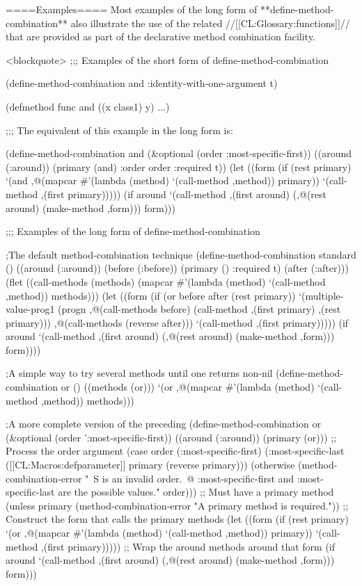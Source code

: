 ====Examples====
Most examples of the long form of **define-method-combination** also illustrate the use of the related //[[CL:Glossary:functions]]// that are provided as part of the declarative method combination facility.

<blockquote> ;;; Examples of the short form of define-method-combination

(define-method-combination and :identity-with-one-argument t)

(defmethod func and ((x class1) y) ...)

;;; The equivalent of this example in the long form is:

(define-method-combination and (&optional (order :most-specific-first)) ((around (:around)) (primary (and) :order order :required t)) (let ((form (if (rest primary) `(and ,@(mapcar #'(lambda (method) `(call-method ,method)) primary)) `(call-method ,(first primary))))) (if around `(call-method ,(first around) (,@(rest around) (make-method ,form))) form)))

;;; Examples of the long form of define-method-combination

;The default method-combination technique (define-method-combination standard () ((around (:around)) (before (:before)) (primary () :required t) (after (:after))) (flet ((call-methods (methods) (mapcar #'(lambda (method) `(call-method ,method)) methods))) (let ((form (if (or before after (rest primary)) `(multiple-value-prog1 (progn ,@(call-methods before) (call-method ,(first primary) ,(rest primary))) ,@(call-methods (reverse after))) `(call-method ,(first primary))))) (if around `(call-method ,(first around) (,@(rest around) (make-method ,form))) form))))

;A simple way to try several methods until one returns non-nil (define-method-combination or () ((methods (or))) `(or ,@(mapcar #'(lambda (method) `(call-method ,method)) methods)))

;A more complete version of the preceding (define-method-combination or (&optional (order ':most-specific-first)) ((around (:around)) (primary (or))) ;; Process the order argument (case order (:most-specific-first) (:most-specific-last ([[CL:Macros:defparameter]] primary (reverse primary))) (otherwise (method-combination-error "~S is an invalid order.~@ :most-specific-first and :most-specific-last are the possible values." order))) ;; Must have a primary method (unless primary (method-combination-error "A primary method is required.")) ;; Construct the form that calls the primary methods (let ((form (if (rest primary) `(or ,@(mapcar #'(lambda (method) `(call-method ,method)) primary)) `(call-method ,(first primary))))) ;; Wrap the around methods around that form (if around `(call-method ,(first around) (,@(rest around) (make-method ,form))) form)))

